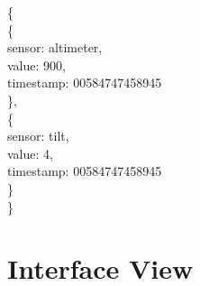 \documentclass[10pt,draftclsnofoot,onecolumn]{IEEEtran}
\begin{document}
{\noindent\{\\
\hspace*{.5cm}\{\\
\hspace*{1cm}sensor: altimeter,\\
\hspace*{1cm}value: 900,\\
\hspace*{1cm}timestamp: 00584747458945\\
\hspace*{.5cm}\},\\
\hspace*{.5cm}\{\\
\hspace*{1cm}sensor: tilt,\\
\hspace*{1cm}value: 4,\\
\hspace*{1cm}timestamp: 00584747458945\\
\hspace*{.5cm}\}\\
\}
}

	\section{Interface View}
	
\end{document}
